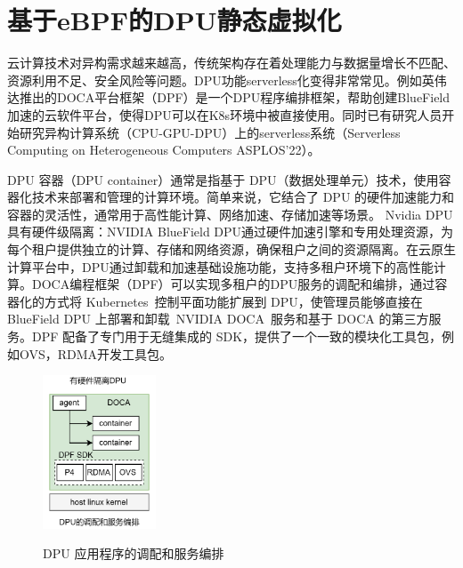 

\section{基于eBPF的DPU静态虚拟化}

云计算技术对异构需求越来越高，传统架构存在着处理能力与数据量增长不匹配、资源利用不足、安全风险等问题。DPU功能serverless化变得非常常见。例如英伟达推出的DOCA平台框架（DPF）是一个DPU程序编排框架，帮助创建BlueField加速的云软件平台，使得DPU可以在K8s环境中被直接使用。同时已有研究人员开始研究异构计算系统（CPU-GPU-DPU）上的serverless系统（Serverless Computing on Heterogeneous Computers ASPLOS’22）。

DPU 容器（DPU container）通常是指基于 DPU（数据处理单元）技术，使用容器化技术来部署和管理的计算环境。简单来说，它结合了 DPU 的硬件加速能力和容器的灵活性，通常用于高性能计算、网络加速、存储加速等场景。
Nvidia DPU具有硬件级隔离：NVIDIA BlueField DPU通过硬件加速引擎和专用处理资源，为每个租户提供独立的计算、存储和网络资源，确保租户之间的资源隔离。在云原生计算平台中，DPU通过卸载和加速基础设施功能，支持多租户环境下的高性能计算。DOCA编程框架（DPF）可以实现多租户的DPU服务的调配和编排，通过容器化的方式将 Kubernetes 控制平面功能扩展到 DPU，使管理员能够直接在 BlueField DPU 上部署和卸载 NVIDIA DOCA 服务和基于 DOCA 的第三方服务。DPF 配备了专门用于无缝集成的 SDK，提供了一个一致的模块化工具包，例如OVS，RDMA开发工具包。

\captionsetup[figure]{justification=justified}
\begin{figure}
	\centering
		\includegraphics[width=0.3\textwidth]{figures/figure2}
 \label{fig:diagram}
 \caption{DPU 应用程序的调配和服务编排}
 
\end{figure}

